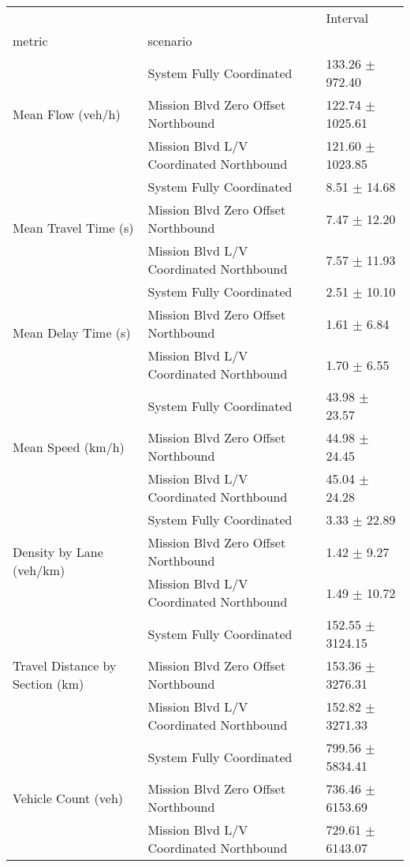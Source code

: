 \begin{tabular}{lll}
\toprule
 &  & Interval \\
metric & scenario &  \\
\midrule
\multirow[t]{3}{*}{Mean Flow (veh/h)} & System Fully Coordinated & 133.26 $\pm$ 972.40 \\
 & Mission Blvd Zero Offset Northbound & 122.74 $\pm$ 1025.61 \\
 & Mission Blvd L/V Coordinated Northbound & 121.60 $\pm$ 1023.85 \\
\multirow[t]{3}{*}{Mean Travel Time (s)} & System Fully Coordinated & 8.51 $\pm$ 14.68 \\
 & Mission Blvd Zero Offset Northbound & 7.47 $\pm$ 12.20 \\
 & Mission Blvd L/V Coordinated Northbound & 7.57 $\pm$ 11.93 \\
\multirow[t]{3}{*}{Mean Delay Time (s)} & System Fully Coordinated & 2.51 $\pm$ 10.10 \\
 & Mission Blvd Zero Offset Northbound & 1.61 $\pm$ 6.84 \\
 & Mission Blvd L/V Coordinated Northbound & 1.70 $\pm$ 6.55 \\
\multirow[t]{3}{*}{Mean Speed (km/h)} & System Fully Coordinated & 43.98 $\pm$ 23.57 \\
 & Mission Blvd Zero Offset Northbound & 44.98 $\pm$ 24.45 \\
 & Mission Blvd L/V Coordinated Northbound & 45.04 $\pm$ 24.28 \\
\multirow[t]{3}{*}{Density by Lane (veh/km)} & System Fully Coordinated & 3.33 $\pm$ 22.89 \\
 & Mission Blvd Zero Offset Northbound & 1.42 $\pm$ 9.27 \\
 & Mission Blvd L/V Coordinated Northbound & 1.49 $\pm$ 10.72 \\
\multirow[t]{3}{*}{Travel Distance by Section (km)} & System Fully Coordinated & 152.55 $\pm$ 3124.15 \\
 & Mission Blvd Zero Offset Northbound & 153.36 $\pm$ 3276.31 \\
 & Mission Blvd L/V Coordinated Northbound & 152.82 $\pm$ 3271.33 \\
\multirow[t]{3}{*}{Vehicle Count (veh)} & System Fully Coordinated & 799.56 $\pm$ 5834.41 \\
 & Mission Blvd Zero Offset Northbound & 736.46 $\pm$ 6153.69 \\
 & Mission Blvd L/V Coordinated Northbound & 729.61 $\pm$ 6143.07 \\
\bottomrule
\end{tabular}
